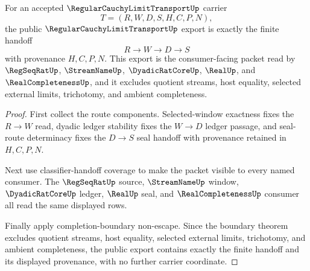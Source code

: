 \begin{theorem}
\label{thm:regular-cauchy-limit-transport-public-export}
For an accepted $\RegularCauchyLimitTransportUp$ carrier
$$
T=(R,W,D,S,H,C,P,N),
$$
the public $\RegularCauchyLimitTransportUp$ export is exactly the finite handoff
$$
R \to W \to D \to S
$$
with provenance $H,C,P,N$. This export is the consumer-facing packet read by $\RegSeqRatUp$, $\StreamNameUp$, $\DyadicRatCoreUp$, $\RealUp$, and $\RealCompletenessUp$, and it excludes quotient streams, host equality, selected external limits, trichotomy, and ambient completeness.
\end{theorem}
\begin{proof}
First collect the route components. Selected-window exactness fixes the $R \to W$ read, dyadic ledger stability fixes the $W \to D$ ledger passage, and seal-route determinacy fixes the $D \to S$ seal handoff with provenance retained in $H,C,P,N$.

Next use classifier-handoff coverage to make the packet visible to every named consumer. The $\RegSeqRatUp$ source, $\StreamNameUp$ window, $\DyadicRatCoreUp$ ledger, $\RealUp$ seal, and $\RealCompletenessUp$ consumer all read the same displayed rows.

Finally apply completion-boundary non-escape. Since the boundary theorem excludes quotient streams, host equality, selected external limits, trichotomy, and ambient completeness, the public export contains exactly the finite handoff and its displayed provenance, with no further carrier coordinate.
\end{proof}

